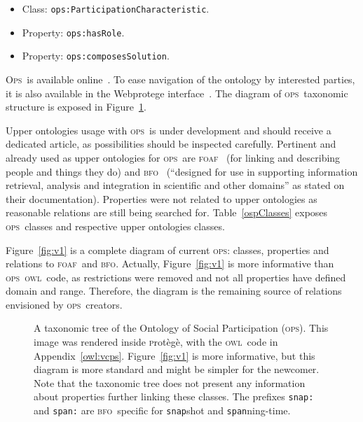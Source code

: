 \documentclass[10pt,letterpaper]{article}
\newcommand{\ops}{\textsc{ops}}
\newcommand{\opsi}{O\textsc{ps}}
\newcommand{\owl}{\textsc{owl}}
\newcommand{\bfo}{\textsc{bfo}}
\newcommand{\foaf}{\textsc{foaf}}
\newcommand{\protege}{\textsc{p}rot\`eg\`e}
\begin{document}
\begin{itemize}
    \item Class: {\tt    ops:ParticipationCharacteristic}.
    \item Property: {\tt ops:hasRole}.
    \item Property: {\tt ops:composesSolution}.
\end{itemize}

\opsi\ is available online~\cite{owlOSP}. To ease navigation of the ontology by interested parties, it is also available in the Webprotege interface~\cite{owlOSPwp}. The diagram of \ops\ taxonomic structure is exposed in Figure~\ref{fig:owlCC}.

Upper ontologies usage with \ops\ is under development and should receive a dedicated article, as possibilities should be inspected carefully. Pertinent and already used as upper ontologies for \ops\ are \foaf~\cite{foaf} (for linking and describing people and things they do) and \bfo~\cite{bfo} (``designed for use in supporting information retrieval, analysis and integration in scientific and other domains'' as stated on their documentation). Properties were not related to upper ontologies as reasonable relations are still being searched for. Table~\ref{ospClasses} exposes \ops\ classes and respective upper ontologies classes.

Figure~\ref{fig:v1} is a complete diagram of current \ops: classes, properties and relations to \foaf\ and \bfo. Actually, Figure~\ref{fig:v1} is more informative than \ops\ \owl\ code, as restrictions were removed and not all properties have defined domain and range. Therefore, the diagram is the remaining source of relations envisioned by \ops\ creators.

\begin{figure}
    \centering
    \caption{A taxonomic tree of the Ontology of Social Participation (\ops). This image was rendered inside \protege, with the \owl\ code in Appendix~\ref{owl:vcps}. Figure~\ref{fig:v1} is more informative, but this diagram is more standard and might be simpler for the newcomer. Note that the taxonomic tree does not present any information about properties further linking these classes. The prefixes {\tt snap:} and {\tt span:} are \bfo\ specific for {\tt snap}shot and {\tt span}ning-time.}
    \label{fig:owlCC}
\end{figure}

\end{document}
